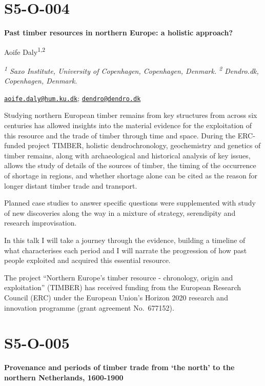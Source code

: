 \documentclass[
]{book}
\begin{document}
\hypertarget{s5-o-004}{%
\section*{S5-O-004}\label{s5-o-004}}

\textbf{Past timber resources in northern Europe: a holistic approach?}

Aoife Daly\textsuperscript{1,2}

\emph{\textsuperscript{1} Saxo Institute, University of Copenhagen, Copenhagen, Denmark. \textsuperscript{2} Dendro.dk, Copenhagen, Denmark.}

\href{mailto:aoife.daly@hum.ku.dk}{\nolinkurl{aoife.daly@hum.ku.dk}}; \href{mailto:dendro@dendro.dk}{\nolinkurl{dendro@dendro.dk}}

Studying northern European timber remains from key structures from across six centuries has allowed insights into the material evidence for the exploitation of this resource and the trade of timber through time and space. During the ERC-funded project TIMBER, holistic dendrochronology, geochemistry and genetics of timber remains, along with archaeological and historical analysis of key issues, allows the study of details of the sources of timber, the timing of the occurrence of shortage in regions, and whether shortage alone can be cited as the reason for longer distant timber trade and transport.

Planned case studies to answer specific questions were supplemented with study of new discoveries along the way in a mixture of strategy, serendipity and research improvisation.

In this talk I will take a journey through the evidence, building a timeline of what characterises each period and I will narrate the progression of how past people exploited and acquired this essential resource.

The project ``Northern Europe's timber resource - chronology, origin and exploitation'' (TIMBER) has received funding from the European Research Council (ERC) under the European Union's Horizon 2020 research and innovation programme (grant agreement No.~677152).

\hypertarget{s5-o-005}{%
\section*{S5-O-005}\label{s5-o-005}}

\textbf{Provenance and periods of timber trade from `the north' to the northern Netherlands, 1600-1900}
\end{document}

